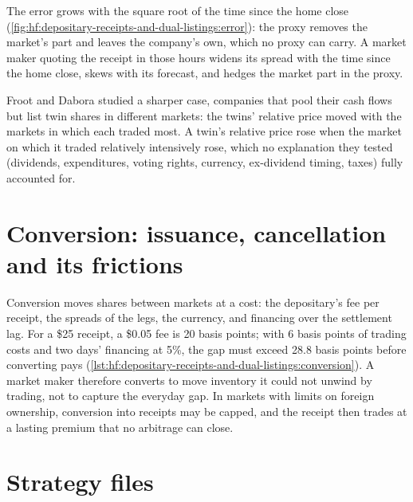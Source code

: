 The error grows with the square root of the time since the home close (\cref{fig:hf:depositary-receipts-and-dual-listings:error}): the proxy
removes the market's part and leaves the company's own, which no proxy can carry. A market maker quoting the receipt in those hours widens its
spread with the time since the home close, skews with its forecast, and hedges the market part in the proxy.

Froot and Dabora studied a sharper case, companies that pool their cash flows but list twin shares in different markets: the twins' relative price
moved with the markets in which each traded most. A twin's relative price rose when the market on which it traded relatively intensively rose, which
no explanation they tested (dividends, expenditures, voting rights, currency, ex-dividend timing, taxes) fully accounted for.

\section{Conversion: issuance, cancellation and its frictions}

Conversion moves shares between markets at a cost: the depositary's fee per receipt, the spreads of the legs, the currency, and financing over the
settlement lag. For a \$25 receipt, a \$0.05 fee is 20 basis points; with 6 basis points of trading costs and two days' financing at 5\%, the gap must
exceed 28.8 basis points before converting pays (\cref{lst:hf:depositary-receipts-and-dual-listings:conversion}). A market maker therefore converts
to move inventory it could not unwind by trading, not to capture the everyday gap. In markets with limits on foreign ownership, conversion into
receipts may be capped, and the receipt then trades at a lasting premium that no arbitrage can close.

\section{Strategy files}

